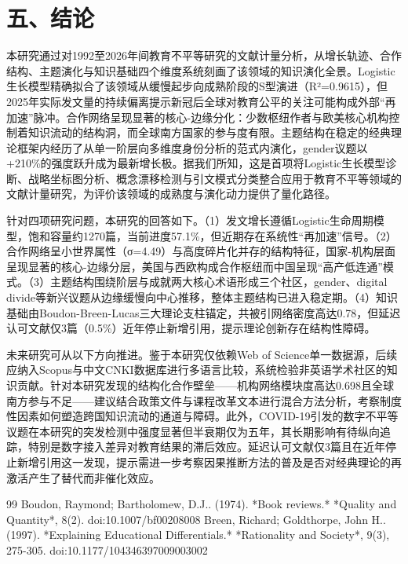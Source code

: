 \documentclass[12pt,a4paper]{article}
\begin{document}
\section{五、结论}

本研究通过对1992至2026年间教育不平等研究的文献计量分析，从增长轨迹、合作结构、主题演化与知识基础四个维度系统刻画了该领域的知识演化全景。Logistic生长模型精确拟合了该领域从缓慢起步向成熟阶段的S型演进（R²=0.9615），但2025年实际发文量的持续偏离提示新冠后全球对教育公平的关注可能构成外部“再加速”脉冲。合作网络呈现显著的核心-边缘分化：少数枢纽作者与欧美核心机构控制着知识流动的结构洞，而全球南方国家的参与度有限。主题结构在稳定的经典理论框架内经历了从单一阶层向多维度身份分析的范式内演化，gender议题以+210\%的强度跃升成为最新增长极。据我们所知，这是首项将Logistic生长模型诊断、战略坐标图分析、概念漂移检测与引文模式分类整合应用于教育不平等领域的文献计量研究，为评价该领域的成熟度与演化动力提供了量化路径。

针对四项研究问题，本研究的回答如下。（1）发文增长遵循Logistic生命周期模型，饱和容量约1270篇，当前进度57.1\%，但近期存在系统性“再加速”信号。（2）合作网络呈小世界属性（σ=4.49）与高度碎片化并存的结构特征，国家-机构层面呈现显著的核心-边缘分层，美国与西欧构成合作枢纽而中国呈现“高产低连通”模式。（3）主题结构围绕阶层与成就两大核心术语形成三个社区，gender、digital divide等新兴议题从边缘缓慢向中心推移，整体主题结构已进入稳定期。（4）知识基础由Boudon-Breen-Lucas三大理论支柱锚定，共被引网络密度高达0.78，但延迟认可文献仅3篇（0.5\%）近年停止新增引用，提示理论创新存在结构性障碍。

未来研究可从以下方向推进。鉴于本研究仅依赖Web of Science单一数据源，后续应纳入Scopus与中文CNKI数据库进行多语言比较，系统检验非英语学术社区的知识贡献。针对本研究发现的结构化合作壁垒——机构网络模块度高达0.698且全球南方参与不足——建议结合政策文件与课程改革文本进行混合方法分析，考察制度性因素如何塑造跨国知识流动的通道与障碍。此外，COVID-19引发的数字不平等议题在本研究的突发检测中强度显著但半衰期仅为五年，其长期影响有待纵向追踪，特别是数字接入差异对教育结果的滞后效应。延迟认可文献仅3篇且在近年停止新增引用这一发现，提示需进一步考察因果推断方法的普及是否对经典理论的再激活产生了替代而非催化效应。

\begin{thebibliography}{99}
 Boudon, Raymond; Bartholomew, D.J.. (1974).  *Book reviews.*  *Quality and Quantity*, 8(2).  doi:10.1007/bf00208008
 Breen, Richard; Goldthorpe, John H.. (1997).  *Explaining Educational Differentials.*  *Rationality and Society*, 9(3), 275-305.  doi:10.1177/104346397009003002
\end{thebibliography}
\end{document}
